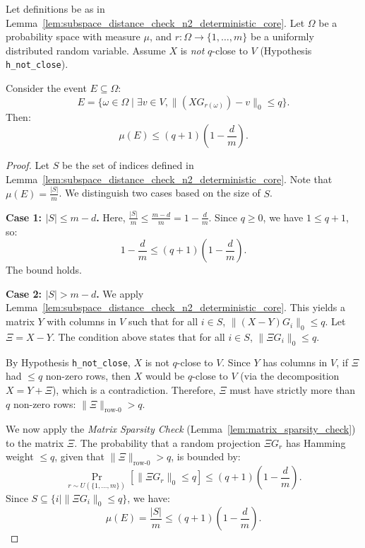 \begin{lemma}\label{lem:subspace_distance_check_n2_main_reduction}  \leanok
{}
Let definitions be as in Lemma~\ref{lem:subspace_distance_check_n2_deterministic_core}.
Let $\Omega$ be a probability space with measure $\mu$, and $r: \Omega \to \{1, \dots, m\}$ be a uniformly distributed random variable.
Assume $X$ is \emph{not} $q$-close to $V$ (Hypothesis \texttt{h\_not\_close}).

Consider the event $E \subseteq \Omega$:
\[ E = \{ \omega \in \Omega \mid \exists v \in V, \| (X G_{r(\omega)}) - v \|_0 \le q \}. \]
Then:
\[ \mu(E) \le (q+1)\left(1 - \frac{d}{m}\right). \]
\end{lemma}
\begin{proof} \leanok
Let $S$ be the set of indices defined in Lemma~\ref{lem:subspace_distance_check_n2_deterministic_core}. Note that $\mu(E) = \frac{|S|}{m}$.
We distinguish two cases based on the size of $S$.

\textbf{Case 1: $|S| \le m - d$.}
Here, $\frac{|S|}{m} \le \frac{m-d}{m} = 1 - \frac{d}{m}$.
Since $q \ge 0$, we have $1 \le q+1$, so:
\[ 1 - \frac{d}{m} \le (q+1)\left(1 - \frac{d}{m}\right). \]
The bound holds.

\textbf{Case 2: $|S| > m - d$.}
We apply Lemma~\ref{lem:subspace_distance_check_n2_deterministic_core}. This yields a matrix $Y$ with columns in $V$ such that for all $i \in S$, $\| (X - Y)G_i \|_0 \le q$.
Let $\Xi = X - Y$.
The condition above states that for all $i \in S$, $\| \Xi G_i \|_0 \le q$.

By Hypothesis \texttt{h\_not\_close}, $X$ is not $q$-close to $V$. Since $Y$ has columns in $V$, if $\Xi$ had $\le q$ non-zero rows, then $X$ would be $q$-close to $V$ (via the decomposition $X = Y + \Xi$), which is a contradiction.
Therefore, $\Xi$ must have strictly more than $q$ non-zero rows: $\|\Xi\|_{\text{row-0}} > q$.

We now apply the \emph{Matrix Sparsity Check} (Lemma~\ref{lem:matrix_sparsity_check}) to the matrix $\Xi$.
The probability that a random projection $\Xi G_r$ has Hamming weight $\le q$, given that $\|\Xi\|_{\text{row-0}} > q$, is bounded by:
\[ \Pr_{r \sim U(\{1,\dots,m\})} [ \| \Xi G_r \|_0 \le q ] \le (q+1)\left(1 - \frac{d}{m}\right). \]
Since $S \subseteq \{ i \mid \| \Xi G_i \|_0 \le q \}$, we have:
\[ \mu(E) = \frac{|S|}{m} \le (q+1)\left(1 - \frac{d}{m}\right). \]
\end{proof}

